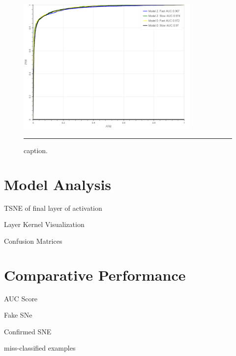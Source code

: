 \begin{figure}[htbp]
  \centering
    \includegraphics[width = 0.8\textwidth]{./Figures/AUC_best_models.png}
    \rule{35em}{0.5pt}
  \caption[Slow Training Performance]{caption.}
  \label{fig:}
\end{figure}

\section{Model Analysis}

  TSNE of final layer of activation
  
  Layer Kernel Visualization

  Confusion Matrices




  


  
\section{Comparative Performance}

  AUC Score

  Fake SNe

  Confirmed SNE
  
  miss-classified examples
